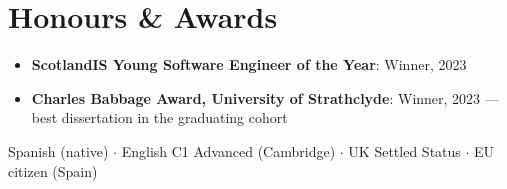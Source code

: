\documentclass[letterpaper,11pt]{article}
\newcommand{\resumeItem}[2]{
  \item\small{
    \textbf{#1}{: #2 \vspace{-2pt}}
  }
}
\newcommand{\resumeSubItem}[2]{\resumeItem{#1}{#2}\vspace{-4pt}}
\newcommand{\resumeSubHeadingListStart}{\begin{itemize}[leftmargin=*]}
\newcommand{\resumeSubHeadingListEnd}{\end{itemize}}
\begin{document}
\section{Honours \& Awards}
  \resumeSubHeadingListStart
    \resumeSubItem{ScotlandIS Young Software Engineer of the Year}{Winner, 2023}
    \resumeSubItem{Charles Babbage Award, University of Strathclyde}{Winner, 2023 --- best dissertation in the graduating cohort}
  \resumeSubHeadingListEnd

\vspace{2pt}
\small{Spanish (native) $\cdot$ English C1 Advanced (Cambridge) $\cdot$ UK Settled Status $\cdot$ EU citizen (Spain)}

\end{document}
